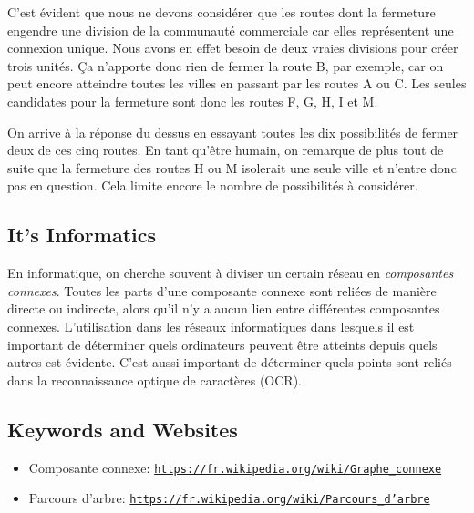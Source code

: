 \documentclass[a4paper,11pt]{report}
\newcommand{\BrochureUrlText}[1]{\texttt{#1}}
\newcommand{\taskGraphicsFolder}{..}
\begin{document}
{\centering%
\par}

C’est évident que nous ne devons considérer que les routes dont la fermeture engendre une division de la communauté commerciale car elles représentent une connexion unique. Nous avons en effet besoin de deux vraies divisions pour créer trois unités. Ça n’apporte donc rien de fermer la route B, par exemple, car on peut encore atteindre toutes les villes en passant par les routes A ou C. Les seules candidates pour la fermeture sont donc les routes F, G, H, I et M.

On arrive à la réponse du dessus en essayant toutes les dix possibilités de fermer deux de ces cinq routes. En tant qu’être humain, on remarque de plus tout de suite que la fermeture des routes H ou M isolerait une seule ville et n’entre donc pas en question. Cela limite encore le nombre de possibilités à considérer.


\subsection*{It’s Informatics}

En informatique, on cherche souvent à diviser un certain réseau en \emph{composantes connexes}. Toutes les parts d’une composante connexe sont reliées de manière directe ou indirecte, alors qu’il n’y a aucun lien entre différentes composantes connexes. L’utilisation dans les réseaux informatiques dans lesquels il est important de déterminer quels ordinateurs peuvent être atteints depuis quels autres est évidente. C’est aussi important de déterminer quels points sont reliés dans la reconnaissance optique de caractères (OCR).

{\raggedright

\subsection*{Keywords and Websites}

\begin{itemize}
  \item Composante connexe: \href{https://fr.wikipedia.org/wiki/Graphe_connexe}{\BrochureUrlText{https://fr.wikipedia.org/wiki/Graphe\_connexe}}
  \item Parcours d’arbre: \href{https://fr.wikipedia.org/wiki/Parcours_d\%27arbre}{\BrochureUrlText{https://fr.wikipedia.org/wiki/Parcours\_d'arbre}}
\end{itemize}


}
\end{document}
